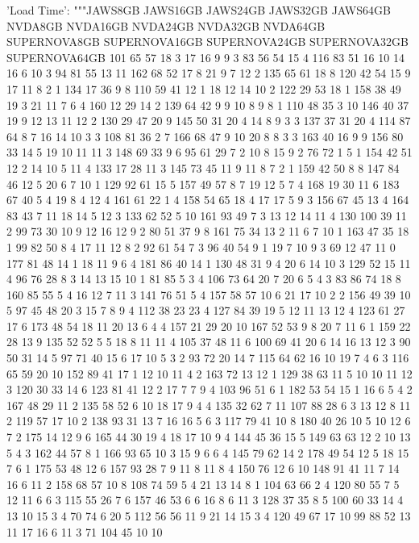 \begin{pyverbatim}
{    'Load Time': """JAWS8GB	JAWS16GB	JAWS24GB	JAWS32GB	JAWS64GB	NVDA8GB	NVDA16GB	NVDA24GB	NVDA32GB	NVDA64GB	SUPERNOVA8GB	SUPERNOVA16GB	SUPERNOVA24GB	SUPERNOVA32GB	SUPERNOVA64GB
101	65	57	18	3	17	16	9	9	3	83	56	54	15	4
116	83	51	16	10	14	16	6	10	3	94	81	55	13	11
162	68	52	17	8	21	9	7	12	2	135	65	61	18	8
120	42	54	15	9	17	11	8	2	1	134	17	36	9	8
110	59	41	12	1	18	12	14	10	2	122	29	53	18	1
158	38	49	19	3	21	11	7	6	4	160	12	29	14	2
139	64	42	9	9	10	8	9	8	1	110	48	35	3	10
146	40	37	19	9	12	13	11	12	2	130	29	47	20	9
145	50	31	20	4	14	8	9	3	3	137	37	31	20	4
114	87	64	8	7	16	14	10	3	3	108	81	36	2	7
166	68	47	9	10	20	8	8	3	3	163	40	16	9	9
156	80	33	14	5	19	10	11	11	3	148	69	33	9	6
95	61	29	7	2	10	8	15	9	2	76	72	1	5	1
154	42	51	12	2	14	10	5	11	4	133	17	28	11	3
145	73	45	11	9	11	8	7	2	1	159	42	50	8	8
147	84	46	12	5	20	6	7	10	1	129	92	61	15	5
157	49	57	8	7	19	12	5	7	4	168	19	30	11	6
183	67	40	5	4	19	8	4	12	4	161	61	22	1	4
158	54	65	18	4	17	17	5	9	3	156	67	45	13	4
164	83	43	7	11	18	14	5	12	3	133	62	52	5	10
161	93	49	7	3	13	12	14	11	4	130	100	39	11	2
99	73	30	10	9	12	16	12	9	2	80	51	37	9	8
161	75	34	13	2	11	6	7	10	1	163	47	35	18	1
99	82	50	8	4	17	11	12	8	2	92	61	54	7	3
96	40	54	9	1	19	7	10	9	3	69	12	47	11	0
177	81	48	14	1	18	11	9	6	4	181	86	40	14	1
130	48	31	9	4	20	6	14	10	3	129	52	15	11	4
96	76	28	8	3	14	13	15	10	1	81	85	5	3	4
106	73	64	20	7	20	6	5	4	3	83	86	74	18	8
160	85	55	5	4	16	12	7	11	3	141	76	51	5	4
157	58	57	10	6	21	17	10	2	2	156	49	39	10	5
97	45	48	20	3	15	7	8	9	4	112	38	23	23	4
127	84	39	19	5	12	11	13	12	4	123	61	27	17	6
173	48	54	18	11	20	13	6	4	4	157	21	29	20	10
167	52	53	9	8	20	7	11	6	1	159	22	28	13	9
135	52	52	5	5	18	8	11	11	4	105	37	48	11	6
100	69	41	20	6	14	16	13	12	3	90	50	31	14	5
97	71	40	15	6	17	10	5	3	2	93	72	20	14	7
115	64	62	16	10	19	7	4	6	3	116	65	59	20	10
152	89	41	17	1	12	10	11	4	2	163	72	13	12	1
129	38	63	11	5	10	10	11	12	3	120	30	33	14	6
123	81	41	12	2	17	7	7	9	4	103	96	51	6	1
182	53	54	15	1	16	6	5	4	2	167	48	29	11	2
135	58	52	6	10	18	17	9	4	4	135	32	62	7	11
107	88	28	6	3	13	12	8	11	2	119	57	17	10	2
138	93	31	13	7	16	16	5	6	3	117	79	41	10	8
180	40	26	10	5	10	12	6	7	2	175	14	12	9	6
165	44	30	19	4	18	17	10	9	4	144	45	36	15	5
149	63	63	12	2	10	13	5	4	3	162	44	57	8	1
166	93	65	10	3	15	9	6	6	4	145	79	62	14	2
178	49	54	12	5	18	15	7	6	1	175	53	48	12	6
157	93	28	7	9	11	8	11	8	4	150	76	12	6	10
148	91	41	11	7	14	16	6	11	2	158	68	57	10	8
108	74	59	5	4	21	13	14	8	1	104	63	66	2	4
120	80	55	7	5	12	11	6	6	3	115	55	26	7	6
157	46	53	6	6	16	8	6	11	3	128	37	35	8	5
100	60	33	14	4	13	10	15	3	4	70	74	6	20	5
112	56	56	11	9	21	14	15	3	4	120	49	67	17	10
99	88	52	13	11	17	16	6	11	3	71	104	45	10	10
}
\end{pyverbatim}
